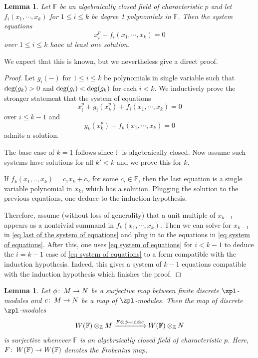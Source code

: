 \documentclass[english,10pt]{amsart}
\newcommand{\field}{\mathbb{F}}
\newtheorem{lem}{Lemma}[section]
\newtheorem{lemm}{Lemma}[section]
\theoremstyle{definition}
\numberwithin{equation}{section}
\def\co{\colon\thinspace}
\begin{document}
\begin{lem}\label{lemm system of polynomials solution}
Let $\field$ be an algebraically closed field of characteristic $p$ and let $f_i(x_1,\cdots,x_k)$ for $1\leq i\leq k$ be degree 1 polynomials in $\field$. Then the system equations
\[x_i^p-f_i(x_1,\cdots,x_k) = 0\]
over $1\leq i\leq k$ have at least one solution.
\end{lem}

We expect that this is known, but we nevertheless give a direct proof.
\begin{proof}
Let $g_i(-)$ for $1\leq i\leq k$ be polynomials in single variable such that $\textup{deg}(g_k)>0$ and   $\textup{deg}(g_i)< \textup{deg}(g_k)$ for each $i <k$. We inductively prove the stronger statement that the system of equations 
\begin{equation}\label{eq system of equations}
x_i^p + g_i(x_k^p) + f_i(x_1,\cdots,x_k) = 0
\end{equation}
over $i\leq k-1$ and 
\begin{equation}\label{eq last of the system of equations}
g_k(x_k^p) + f_k(x_1,\cdots,x_k) = 0
\end{equation}
admits a solution.


The base case of $k=1$ follows since $\field$ is algebraically closed. Now assume such systems have solutions for all $k'<k$ and we prove this for $k$. 

If $f_k(x_1,..,x_k) = c_1x_k + c_2$ for some $c_i \in \field$, then the last equation is a single variable polynomial in $x_k$, which has a solution. Plugging the solution to the previous equations, one deduce to the induction hypothesis. 

Therefore, assume (without loss  of generality) that a unit multiple of $x_{k-1}$ appears as a nontrivial summand  in $f_k(x_1,\cdots,x_k)$. Then we can solve for $x_{k-1}$  in \eqref{eq last of the system of equations} and plug in to the equations in \eqref{eq system of equations}. After this, one uses \eqref{eq system of equations} for $i<k-1$ to deduce the $i= k-1$ case of \eqref{eq system of equations} to a form compatible with the induction hypothesis. Indeed, this gives  a system of $k-1$ equations compatible with the induction hypothesis which finishes the proof.
\end{proof}


\begin{lemm}\label{lemm H  is surjective before modding by p}
Let  $\phi\co M \to N$ be a surjective map between finite discrete $\zpl$-modules and $c\co M\to N$ be a map of $\zpl$-modules. Then the map of discrete $\zpl$-modules
\[
W(\field)  \otimes_{\mathbb{Z}} M \xrightarrow{F \otimes \phi - \textup{id} \otimes c} W(\field)  \otimes_{\mathbb{Z}}N
\]
is surjective whenever $\field$ is an algebraically closed field of characteristic $p$.  Here, $F \co W(\field) \to W(\field)$ denotes the Frobenius map.
\end{lemm}
\end{document}
